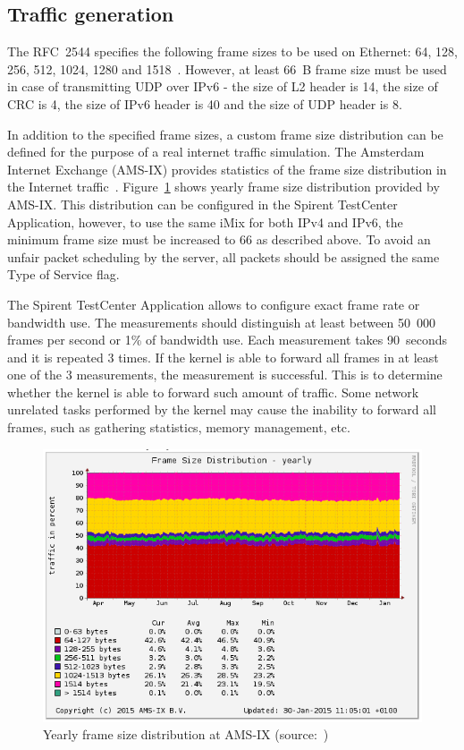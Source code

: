 
\subsection{Traffic generation}
The RFC~2544 specifies the following frame sizes to be used on Ethernet:
64, 128, 256, 512, 1024, 1280 and 1518~\cite{rfc2544}.
However, at least 66~B frame size must be used in case of transmitting UDP over IPv6 - the size of L2 header is 14,
the size of CRC is 4, the size of IPv6 header is 40 and the size of UDP header is 8.

In addition to the specified frame sizes, a custom frame size distribution can be defined for the purpose of
a real internet traffic simulation.
The Amsterdam Internet Exchange (AMS-IX) provides
statistics of the frame size distribution in the Internet traffic~\cite{amsix-frame-size}.
Figure~\ref{fig:analysis-amsix-frame-size} shows yearly frame size distribution provided by AMS-IX.
This distribution can be configured in the Spirent TestCenter Application, however,
to use the same iMix for both IPv4 and IPv6, the minimum frame size must be increased to 66 as described above.
To avoid an unfair packet scheduling by the server, all packets should be assigned the same Type of Service flag.

The Spirent TestCenter Application allows to configure exact frame rate or bandwidth use.
The measurements should distinguish at least between 50~000 frames per second or 1\% of bandwidth use.
Each measurement takes 90~seconds and it is repeated 3 times.
If the kernel is able to forward all frames in at least one of the 3 measurements,
the measurement is successful.
This is to determine whether the kernel is able to forward such amount of traffic.
Some network unrelated tasks performed by the kernel may cause the inability to forward all frames,
such as gathering statistics, memory management, etc.

\begin{figure}
	\centering
	\includegraphics[width=14.5cm,keepaspectratio]{fig/amsix.png}
	\caption{Yearly frame size distribution at AMS-IX (source:~\cite{amsix-frame-size})}
	\label{fig:analysis-amsix-frame-size}
\end{figure}
